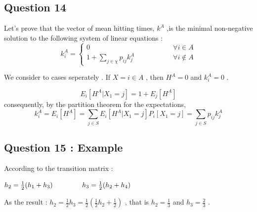 \documentclass[a4paper]{article}
\begin{document}
{{		\subsection{{\Large Question 14}}
	
		Let's prove that the vector of mean hitting times, $k^{A}$ ,is the minimal non-negative solution to the following system of linear equations :
		\begin{equation}
		k^{A}_i = 
			\begin{cases}
			0 \hspace{3cm} & \forall i \in A \\
			1+\sum_{j \in \chi} p_{ij} k^{A}_{j} \hspace{2cm} & \forall i \notin A
			\end{cases}
		\end{equation}
		
		We consider to cases seperately . If $X = i \in A $ , then $H^{A} = 0$ and $k^{A}_i = 0$ .
		
		\[E_i[H^{A}| X_1 = j] = 1 + E_j[H^{A}]\]consequently, by the partition theorem for the expectations,
		\[k^{A}_i = E_i[H^{A}] = \sum_{j \in S} E_i[H^{A} | X_1 = j ]P_i[X_1 = j] = \sum_{j \in S} p_{ij}k^{A}_j\]
		
		\subsection{{\Large Question 15 :} Example}
		According to the transition matrix : 

	\begin{center}
		$h_2 = \frac{1}{2} (h_1 + h_3) \hspace{1.5cm} h_3 = \frac{1}{2} (h_2 + h_4)$
	\end{center}
	As the result : $h_2 = \frac{1}{2} h_3 = \frac{1}{2} (\frac{1}{2}h_2 + \frac{1}{2})$ , that is $h_2 = \frac{1}{3}$ and $h_3 = \frac{2}{3}$ .
	
}}
\end{document}
